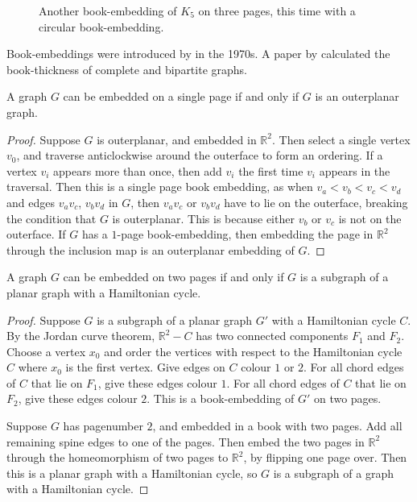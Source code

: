 \begin{figure}[h!]
	\centering
	
	\caption[Three-page circular book-embedding of $K_5$]{Another book-embedding of $K_5$ on three pages, this time with a circular book-embedding.}\label{fig:circular_book-embedding}
\end{figure}

Book-embeddings were introduced by \textcite{kainenRecentResultsTopological1974, ollmannBookThicknessVarious1973} in the 1970s. A paper by \textcite{bernhartBookThicknessGraph1979} calculated the book-thickness of complete and bipartite graphs.
\begin{proposition}\label{lem:Pagenumber_1}
	A graph \(G\) can be embedded on a single page if and only if \(G\) is an outerplanar graph.
\end{proposition}
\begin{proof}
	Suppose $G$ is outerplanar, and embedded in $\mathbb{R}^2$. Then select a single vertex $v_0$, and traverse anticlockwise around the outerface to form an ordering. If a vertex $v_i$ appears more than once, then add $v_i$ the first time $v_i$ appears in the traversal. Then this is a single page book embedding, as when $v_a < v_b < v_c < v_d$ and edges $v_a v_c$, $v_b v_d$ in $G$, then $v_a v_c$ or $v_b v_d$ have to lie on the outerface, breaking the condition that $G$ is outerplanar. This is because either $v_b$ or $v_c$ is not on the outerface. If $G$ has a $1$-page book-embedding, then embedding the page in $\mathbb{R}^2$ through the inclusion map is an outerplanar embedding of $G$. 
\end{proof}
\begin{proposition}\label{lem:Pagenumber_2}
	A graph \(G\) can be embedded on two pages if and only if \(G\) is a subgraph of a planar graph with a Hamiltonian cycle.
\end{proposition}

\begin{proof}
	Suppose $G$ is a subgraph of a planar graph $G'$ with a Hamiltonian cycle $C$. By the Jordan curve theorem, $\mathbb{R}^2 - C$ has two connected components $F_1$ and $F_2$. Choose a vertex $x_0$ and order the vertices with respect to the Hamiltonian cycle $C$ where $x_0$ is the first vertex. Give edges on $C$ colour $1$ or $2$. For all chord edges of $C$ that lie on $F_1$, give these edges colour $1$. For all chord edges of $C$ that lie on $F_2$, give these edges colour $2$. This is a book-embedding of $G'$ on two pages. 
	\par
	Suppose $G$ has pagenumber $2$, and embedded in a book with two pages. Add all remaining spine edges to one of the pages. Then embed the two pages in $\mathbb{R}^2$ through the homeomorphism of two pages to $\mathbb{R}^2$, by flipping one page over. Then this is a planar graph with a Hamiltonian cycle, so $G$ is a subgraph of a graph with a Hamiltonian cycle.
\end{proof}

